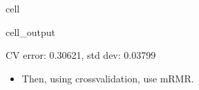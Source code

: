 \documentclass[letterpaper,10pt,english]{jupyterBook}
\begin{document}
\begin{sphinxuseclass}{cell}
\begin{sphinxVerbatimOutput}
\begin{sphinxuseclass}{cell_output}
\begin{sphinxVerbatim}[commandchars=\\\{\}]
CV error: 0.30621, std dev: 0.03799
\end{sphinxVerbatim}

\end{sphinxuseclass}\end{sphinxVerbatimOutput}

\end{sphinxuseclass}\begin{itemize}
\item {} 
\sphinxAtStartPar
Then, using cross\sphinxhyphen{}validation, use mRMR.

\end{itemize}
\end{document}
